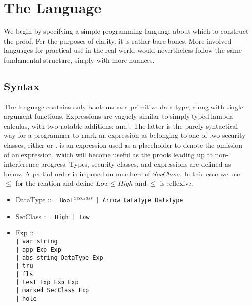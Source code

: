 \documentclass[12pt]{report}
\begin{document}
\section{The Language}



We begin by specifying a simple programming language about which to
construct the proof. For the purposes of clarity, it is rather bare
bones. More involved languages for practical use in the real world
would nevertheless follow the same fundamental structure, simply with
more nuances.

\subsection{Syntax}



The language contains only booleans as a primitive data type, along
with single-argument functions. Expressions are vaguely similar to
simply-typed lambda calculus, with two notable additions:
 and . The latter is the
purely-syntactical way for a programmer to mark an expression as
belonging to one of two security classes, either  or
.  is an expression used as
a placeholder to denote the omission of an expression, which will
become useful as the proofs leading up to non-interference progress.
Types, security classes, and expressions are defined as below.
A partial order is imposed on members of $SecClass$. In this case we
use $\leq$ for the relation and define $Low\leq High$ and $\leq$ is
reflexive.


\begin{itemize}
    \item  DataType ::= $\texttt{Bool}^{SecClass}$ \texttt{| Arrow DataType DataType }

\item  SecClass ::= \texttt{High | Low }

\item  Exp ::= \texttt{\\
    | var string \\
    | app Exp Exp \\
    | abs string DataType Exp \\
    | tru \\
    | fls \\
    | test Exp Exp Exp \\
    | marked SecClass Exp \\
    | hole}


\end{itemize}
\end{document}
